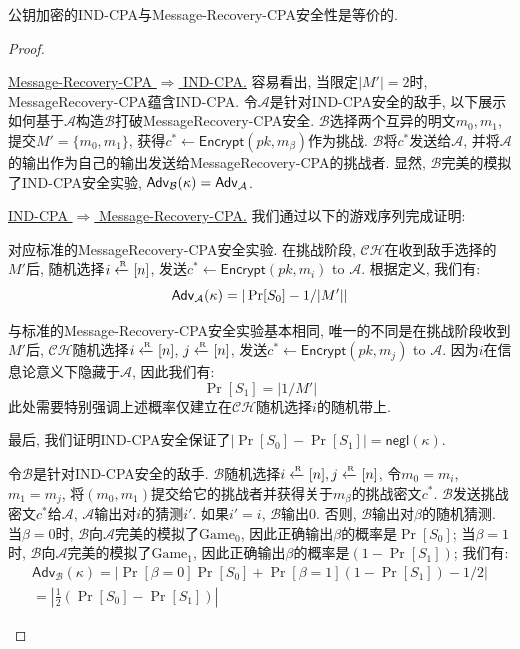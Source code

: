 \begin{theorem}
公钥加密的IND-CPA与Message-Recovery-CPA安全性是等价的.  
\end{theorem}
\begin{proof}
\begin{trivlist}
\item \ul{Message-Recovery-CPA $\Rightarrow$ IND-CPA.} 容易看出, 当限定$|M'| = 2$时, MessageRecovery-CPA蕴含IND-CPA.  
    令$\mathcal{A}$是针对IND-CPA安全的敌手, 以下展示如何基于$\mathcal{A}$构造$\mathcal{B}$打破MessageRecovery-CPA安全. 
    $\mathcal{B}$选择两个互异的明文$m_0, m_1$, 提交$M' = \{m_0, m_1\}$, 
    获得$c^* \leftarrow \mathsf{Encrypt}(pk, m_\beta)$作为挑战. 
    $\mathcal{B}$将$c^*$发送给$\mathcal{A}$, 并将$\mathcal{A}$的输出作为自己的输出发送给MessageRecovery-CPA的挑战者.  
    显然, $\mathcal{B}$完美的模拟了IND-CPA安全实验, $\mathsf{Adv}_\mathcal{B}(\kappa) = \mathsf{Adv}_\mathcal{A}$. 

\item \ul{IND-CPA $\Rightarrow$ Message-Recovery-CPA.} 我们通过以下的游戏序列完成证明: 

\item {} 对应标准的MessageRecovery-CPA安全实验. 在挑战阶段, 
    $\mathcal{CH}$在收到敌手选择的$M'$后, 随机选择$i \xleftarrow{\textup{\tiny R}} [n]$, 
    发送$c^* \leftarrow \mathsf{Encrypt}(pk, m_i)$ to $\mathcal{A}$. 根据定义, 我们有: 
    \begin{equation*}
    	\mathsf{Adv}_\mathcal{A}(\kappa) = |\Pr[S_0] - 1/|M'||
    \end{equation*}

\item {} 与标准的Message-Recovery-CPA安全实验基本相同, 唯一的不同是在挑战阶段收到$M'$后, 
	$\mathcal{CH}$随机选择$i \xleftarrow{\textup{\tiny R}} [n]$, $j \xleftarrow{\textup{\tiny R}} [n]$, 
    发送$c^* \leftarrow \mathsf{Encrypt}(pk, m_j)$ to $\mathcal{A}$. 
    因为$i$在信息论意义下隐藏于$\mathcal{A}$, 因此我们有: 
    \begin{equation*}
    	\Pr[S_1] = |1/M'|
    \end{equation*}
    此处需要特别强调上述概率仅建立在$\mathcal{CH}$随机选择$i$的随机带上. 

\item 最后, 我们证明IND-CPA安全保证了$|\Pr[S_0] - \Pr[S_1]| = \mathsf{negl}(\kappa)$. 
\item 令$\mathcal{B}$是针对IND-CPA安全的敌手. $\mathcal{B}$随机选择$i \xleftarrow{\textup{\tiny R}} [n], j \xleftarrow{\textup{\tiny R}} [n]$, 
    令$m_0 = m_i$, $m_1 = m_j$, 将$(m_0, m_1)$提交给它的挑战者并获得关于$m_\beta$的挑战密文$c^*$. 
    $\mathcal{B}$发送挑战密文$c^*$给$\mathcal{A}$, $\mathcal{A}$输出对$i$的猜测$i'$. 
    如果$i' = i$, $\mathcal{B}$输出$0$. 否则, $\mathcal{B}$输出对$\beta$的随机猜测. 
    当$\beta=0$时, $\mathcal{B}$向$\mathcal{A}$完美的模拟了$\text{Game}_0$, 
    因此正确输出$\beta$的概率是$\Pr[S_0]$; 
    当$\beta=1$时, $\mathcal{B}$向$\mathcal{A}$完美的模拟了$\text{Game}_1$, 
    因此正确输出$\beta$的概率是$(1-\Pr[S_1])$; 
    我们有: 
\begin{gather*}
    \mathsf{Adv}_\mathcal{B}(\kappa) = |\Pr[\beta = 0] \Pr[S_0] + \Pr[\beta = 1] (1-\Pr[S_1])-1/2| \\
    = \left|\frac{1}{2}(\Pr[S_0] - \Pr[S_1])\right|
\end{gather*}


\end{trivlist}
\end{proof}
